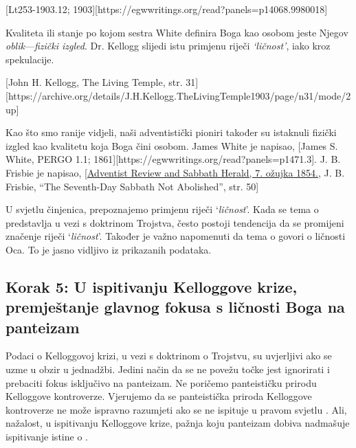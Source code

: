 [Lt253-1903.12; 1903][https://egwwritings.org/read?panels=p14068.9980018]

Kvaliteta ili stanje po kojom sestra White definira Boga kao osobom jeste Njegov \textit{oblik}—\textit{fizički izgled}. Dr. Kellogg slijedi istu primjenu riječi \textit{‘ličnost’}, iako kroz spekulacije.

[John H. Kellogg, The Living Temple, str. 31][https://archive.org/details/J.H.Kellogg.TheLivingTemple1903/page/n31/mode/2up]

Kao što smo ranije vidjeli, naši adventistički pioniri također su istaknuli fizički izgled kao kvalitetu koja Boga čini osobom. James White je napisao, [James S. White, PERGO 1.1; 1861][https://egwwritings.org/read?panels=p1471.3]. J. B. Frisbie je napisao, [\href{https://documents.adventistarchives.org/Periodicals/RH/RH18540307-V05-07.pdf}{Adventist Review and Sabbath Herald, 7. ožujka 1854.}, J. B. Frisbie, “The Seventh-Day Sabbath Not Abolished”, str. 50]

U svjetlu činjenica, prepoznajemo primjenu riječi ‘\textit{ličnost}’. Kada se tema o  predstavlja u vezi s doktrinom Trojstva, često postoji tendencija da se promijeni značenje riječi ‘\textit{ličnost}’. Također je važno napomenuti da tema o  govori o ličnosti Oca. To je jasno vidljivo iz prikazanih podataka.

\subsection*{Korak 5: U ispitivanju Kelloggove krize, premještanje glavnog fokusa s ličnosti Boga na panteizam}

Podaci o Kelloggovoj krizi, u vezi s doktrinom o Trojstvu, su uvjerljivi ako se  uzme u obzir u jednadžbi. Jedini način da se ne povežu točke jest ignorirati  i prebaciti fokus isključivo na panteizam. Ne poričemo panteističku prirodu Kelloggove kontroverze. Vjerujemo da se panteistička priroda Kelloggove kontroverze ne može ispravno razumjeti ako se ne ispituje u pravom svjetlu . Ali, nažalost, u ispitivanju Kelloggove krize, pažnja koju panteizam dobiva nadmašuje ispitivanje istine o .

